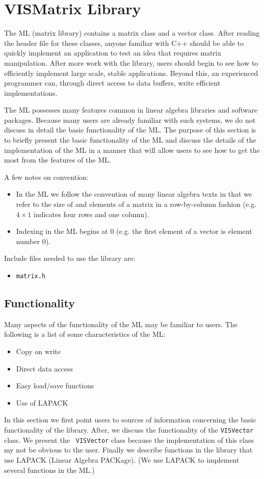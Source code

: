 \section{VISMatrix Library}
The ML (matrix library) contains a matrix class and a vector class.  
After reading the header file for these classes, anyone familiar with 
C++ should be able to quickly implement an application to test an idea 
that requires matrix manipulation.  After more work with the library, 
users should begin to see how to efficiently implement large scale, 
stable applications.  Beyond this, an experienced programmer can, 
through direct access to data buffers, write efficient implementations.

The ML possesses many features common in linear algebra libraries and 
software packages.  Because many users are already familiar with such 
systems, we do not discuss in detail the basic functionality of the 
ML.  The purpose of this section is to briefly present the basic 
functionality of the ML and discuss the details of the implementation 
of the ML in a manner that will allow users to see how to get the most 
from the features of the ML.

A few notes on convention:
\begin{itemize}
\item{In the ML we follow the convention of many linear algebra texts
in that we refer to the size of and elements of a matrix in
a row-by-column fashion (e.g. $4 \times 1$ indicates 
four rows and one column).}
\item{Indexing in the ML begins at 0 (e.g. the first element of a vector
is element number 0).}
\end{itemize}

Include files needed to use the library are:
\begin{itemize}
\item {\tt matrix.h}
\end{itemize}

\subsection{Functionality}
Many aspects of the functionality of the ML may be familiar to
users.
The following is a list of some characteristics of the ML:
\begin{itemize}
\item{Copy on write}
\item{Direct data access}
\item{Easy load/save functions}
\item{Use of LAPACK}
\end{itemize}
In this section we first point users to sources of information 
concerning the basic functionality of the library.  After, we discuss 
the functionality of the {\tt VISVector} class.  We present the {\tt 
VISVector} class because the implementation of this class my not be 
obvious to the user.  Finally we describe functions in the library 
that use LAPACK (Linear Algebra PACKage).  (We use LAPACK to implement 
several functions in the ML.)

